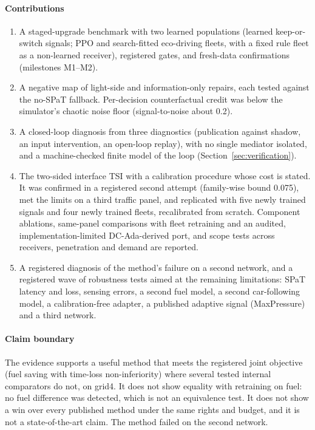 \paragraph{Contributions}
\begin{enumerate}\setlength\itemsep{1pt}
\item A staged-upgrade benchmark with two learned populations (learned keep-or-switch signals; PPO and search-fitted eco-driving fleets,
with a fixed rule fleet as a non-learned receiver), registered gates, and fresh-data confirmations (milestones M1--M2).
\item A negative map of light-side and information-only repairs, each tested against the no-SPaT fallback. Per-decision counterfactual
credit was below the simulator's chaotic noise floor (signal-to-noise about 0.2).
\item A closed-loop diagnosis from three diagnostics (publication against shadow, an input intervention, an open-loop replay), with no
single mediator isolated, and a machine-checked finite model of the loop (Section~\ref{sec:verification}).
\item The two-sided interface TSI with a calibration procedure whose cost is stated. It was confirmed in a registered second attempt
(family-wise bound 0.075), met the limits on a third traffic panel, and replicated with five newly trained signals and four newly trained
fleets, recalibrated from scratch. Component ablations, same-panel comparisons with fleet retraining and an audited, implementation-limited DC-Ada-derived port, and scope
tests across receivers, penetration and demand are reported.
\item A registered diagnosis of the method's failure on a second network, and a registered wave of robustness tests aimed at the
remaining limitations: SPaT latency and loss, sensing errors, a second fuel model, a second car-following model, a calibration-free
adapter, a published adaptive signal (MaxPressure) and a third network.
\end{enumerate}

\paragraph{Claim boundary} The evidence supports a useful method that meets the registered joint objective (fuel saving with
time-loss non-inferiority) where several tested internal comparators do not, on grid4. It does not show
equality with retraining on fuel: no fuel difference was detected, which is not an equivalence test. It does not show a win over every
published method under the same rights and budget, and it is not a state-of-the-art claim. The method failed on the second network.

